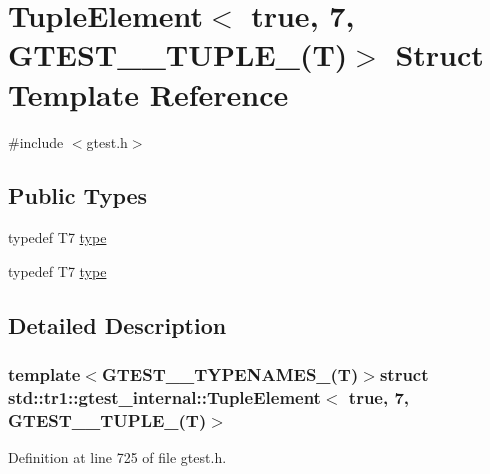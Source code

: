 \hypertarget{structstd_1_1tr1_1_1gtest__internal_1_1TupleElement_3_01true_00_017_00_01GTEST__10__TUPLE___07T_08_4}{\section{\-Tuple\-Element$<$ true, 7, \-G\-T\-E\-S\-T\-\_\-\_\-\-T\-U\-P\-L\-E\-\_\-(\-T)$>$ \-Struct \-Template \-Reference}
\label{db/d6d/structstd_1_1tr1_1_1gtest__internal_1_1TupleElement_3_01true_00_017_00_01GTEST__10__TUPLE___07T_08_4}
}


{\ttfamily \#include $<$gtest.\-h$>$}

\subsection*{\-Public \-Types}
\begin{DoxyCompactItemize}
\item 
typedef \-T7 \hyperlink{structstd_1_1tr1_1_1gtest__internal_1_1TupleElement_3_01true_00_017_00_01GTEST__10__TUPLE___07T_08_4_a1407106c1eb93c1ef7727c48a9225859}{type}
\item 
typedef \-T7 \hyperlink{structstd_1_1tr1_1_1gtest__internal_1_1TupleElement_3_01true_00_017_00_01GTEST__10__TUPLE___07T_08_4_a1407106c1eb93c1ef7727c48a9225859}{type}
\end{DoxyCompactItemize}


\subsection{\-Detailed \-Description}
\subsubsection*{template$<$\-G\-T\-E\-S\-T\-\_\-\_\-\-T\-Y\-P\-E\-N\-A\-M\-E\-S\-\_\-(\-T)$>$struct std\-::tr1\-::gtest\-\_\-internal\-::\-Tuple\-Element$<$ true, 7, G\-T\-E\-S\-T\-\_\-\_\-\-T\-U\-P\-L\-E\-\_\-(\-T)$>$}



\-Definition at line 725 of file gtest.\-h.



